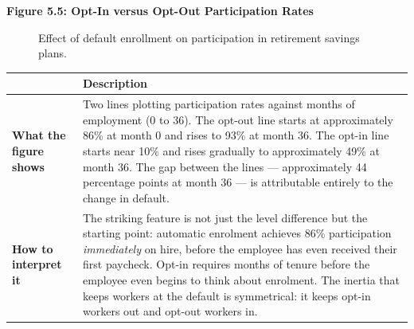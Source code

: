 \documentclass[12pt, letterpaper]{article}
\begin{document}
\textbf{Figure 5.5: Opt-In versus Opt-Out Participation Rates}
\begin{figure}[ht]
\centering
{}
\caption{Effect of default enrollment on participation in retirement savings plans.}
\end{figure}



\begin{table}[H]
\centering
\small
\begin{tabularx}{\linewidth}{lY}
\toprule
 & Description \\
\midrule
\textbf{What the figure shows} & Two lines plotting participation rates against months of employment (0 to 36). The opt-out line starts at approximately 86\% at month 0 and rises to 93\% at month 36. The opt-in line starts near 10\% and rises gradually to approximately 49\% at month 36. The gap between the lines --- approximately 44 percentage points at month 36 --- is attributable entirely to the change in default. \\
\textbf{How to interpret it} & The striking feature is not just the level difference but the starting point: automatic enrolment achieves 86\% participation \textit{immediately} on hire, before the employee has even received their first paycheck. Opt-in requires months of tenure before the employee even begins to think about enrolment. The inertia that keeps workers at the default is symmetrical: it keeps opt-in workers out and opt-out workers in. \\
\bottomrule
\end{tabularx}
\end{table}
\end{document}
